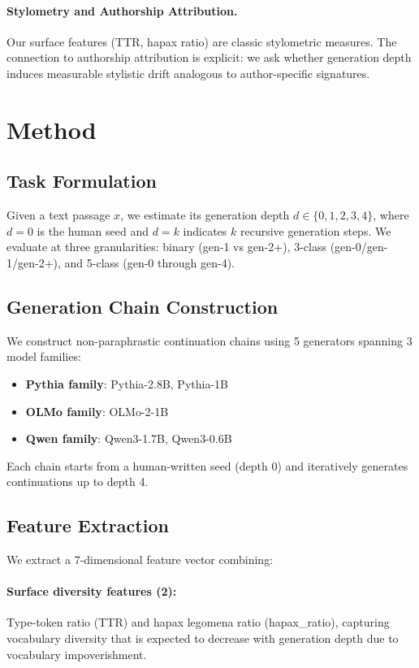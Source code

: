 \documentclass[11pt,a4paper]{article}
\begin{document}
\paragraph{Stylometry and Authorship Attribution.}
Our surface features (TTR, hapax ratio) are classic stylometric measures.
The connection to authorship attribution is explicit: we ask whether generation depth induces measurable stylistic drift analogous to author-specific signatures.

\section{Method}
\label{sec:method}

\subsection{Task Formulation}

Given a text passage $x$, we estimate its generation depth $d \in \{0, 1, 2, 3, 4\}$, where $d=0$ is the human seed and $d=k$ indicates $k$ recursive generation steps.
We evaluate at three granularities: binary (gen-1 vs gen-2+), 3-class (gen-0/gen-1/gen-2+), and 5-class (gen-0 through gen-4).

\subsection{Generation Chain Construction}

We construct non-paraphrastic continuation chains using 5 generators spanning 3 model families:
\begin{itemize}
    \item \textbf{Pythia family}: Pythia-2.8B, Pythia-1B
    \item \textbf{OLMo family}: OLMo-2-1B
    \item \textbf{Qwen family}: Qwen3-1.7B, Qwen3-0.6B
\end{itemize}
Each chain starts from a human-written seed (depth 0) and iteratively generates continuations up to depth 4.

\subsection{Feature Extraction}

We extract a 7-dimensional feature vector combining:

\paragraph{Surface diversity features (2):} Type-token ratio (TTR) and hapax legomena ratio (hapax\_ratio), capturing vocabulary diversity that is expected to decrease with generation depth due to vocabulary impoverishment.
\end{document}
